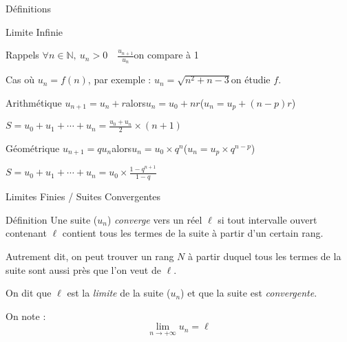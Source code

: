 \documentclass{cours}
\begin{document}
\begin{Gpartie}{Définitions}
\begin{Spartie}{Limite Infinie}
\begin{SSpartie}{Rappels}
                $\forall n\in\mathbb{N},\ u_n>0\quad\frac{u_{n+1}}{u_n}$\quad on compare à 1

                Cas où $u_n=f(n)$, par exemple : $u_n=\sqrt{n^2+n-3}$\quad on étudie $f$.
                \begin{SSSpartie}{Arithmétique} 
                    $u_{n+1}=u_n+r$\quad alors\quad $u_n=u_0+nr$\quad\big($u_n=u_p+(n-p)r$\big)

                    $S=u_0+u_1+\dotsb+u_n=\frac{u_0+u_n}{2}\times(n+1)$
                \end{SSSpartie}
                \begin{SSSpartie}{Géométrique} 
                    $u_{n+1}=qu_n$\quad alors\quad $u_n=u_0\times q^n$\quad\big($u_n=u_p\times q^{n-p}$\big)

                    $S=u_0+u_1+\dotsb+u_n=u_0\times\frac{1-q^{n+1}}{1-q}$
                \end{SSSpartie}
            \end{SSpartie}
        \end{Spartie}
        \begin{Spartie}{Limites Finies / Suites Convergentes} 
            \begin{SSpartie}{Définition} 
                Une suite ($u_n$) \emph{converge} vers un réel $\ell$ si tout intervalle ouvert contenant $\ell$ contient tous les termes de la suite à partir d'un certain rang.

                Autrement dit, on peut trouver un rang $N$ à partir duquel tous les termes de la suite sont aussi près que l'on veut de $\ell$.

                On dit que $\ell$ est la \emph{limite} de la suite ($u_n$) et que la suite est \emph{convergente}.

                On note : \[\boxed{\lim\limits_{n\to +\infty} u_n=\ell}\]


\end{SSpartie}
\end{Spartie}
\end{Gpartie}
\end{document}
